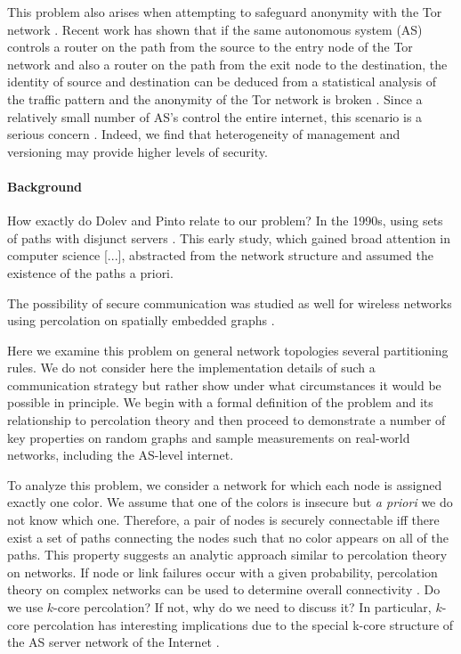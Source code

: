 \documentclass[aps, pre, twocolumn, a4paper, superscriptaddress, floatfix]{revtex4}
\begin{document}
This problem also arises when attempting to safeguard anonymity with the Tor network \cite{dingledine-proceedings2004}.  
Recent work has shown that if the same autonomous system (AS) controls a router on the path from the source to the entry node of the Tor network and also a router on the path from the exit node to the destination, the identity of source and destination can be deduced from a statistical analysis of the traffic pattern and the anonymity of the Tor network is broken \cite{murdoch-proceedings2007}.
Since a relatively small number of AS's control the entire internet, this scenario is a serious concern \cite{edman-proceedings2009}.
Indeed, we find that heterogeneity of management and versioning may provide higher levels of security.


\paragraph{Background}

{ \color{red} How exactly do Dolev and Pinto relate to our problem? }
In the 1990s, using sets of paths with disjunct servers \cite{dolev-acm1993}.
This early study, which gained broad attention in computer science [...],
abstracted from the network structure and assumed the existence of the paths a priori. 

The possibility of secure communication was studied as
well for wireless networks using percolation on spatially embedded
graphs \cite{pinto-ieee2012}. 


Here we examine this problem on general network topologies several partitioning rules.  
We do not consider here the implementation details of such a communication strategy but rather show under what circumstances it would be possible in principle.
We begin with a formal definition of the problem and its relationship to percolation theory and then proceed to demonstrate a number of key properties on random graphs and sample measurements on real-world networks, including the AS-level internet.

To analyze this problem, we consider a network for which each node is assigned exactly one color.
We assume that one of the colors is insecure but \textit{a priori} we do not know  which one.
Therefore, a pair of nodes is securely connectable iff there exist a set of paths connecting the nodes such that no color appears on all of the paths.  
This property suggests an analytic approach similar to percolation theory on networks.
If node or link failures occur with a given probability, 
percolation theory on complex networks can be used to determine overall connectivity \cite{cohen-book2010,newman-book2010}. 
{\color{red} Do we use $k$-core percolation? If not, why do we need to discuss it?}
In particular, $k$-core percolation \cite{dorogovtsev-prl2006} has interesting implications due to the special k-core structure of the AS server network of the
Internet \cite{tauro-ieee2001,carmi-pnas2007}. 
\end{document}
